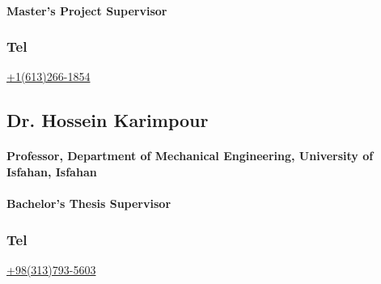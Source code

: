\documentclass[a4paper]{article}
\begin{document}
\paragraph{\bfseries Master's Project Supervisor}

{\large\subsubsection{Tel} {\href{tel:+16132661854}{+1(613)266-1854}}}

\Large\href{mailto:amirhossein.monjazeb@uottawa.ca}{}
\Large\href{https://uniweb.uottawa.ca/members/5272/profile}{}
\Large\href{https://www.linkedin.com/in/amirhossein-monjazeb-0041625b/?originalSubdomain=ca}{}
    
\subsection{Dr. Hossein Karimpour}
\paragraph{\bfseries Professor, Department of Mechanical Engineering, University of Isfahan, Isfahan}
\paragraph{\bfseries Bachelor's Thesis Supervisor}

{\large\subsubsection{Tel} {\href{tel:+983137935603}{+98(313)793-5603}}}

\Large\href{mailto:h.karimpour@eng.ui.ac.ir}{}
\Large\href{http://eng.ui.ac.ir/~h.karimpour}{}
\Large\href{https://www.linkedin.com/in/hossein-karimpour-38373811a}{}


        

        
\end{document}

